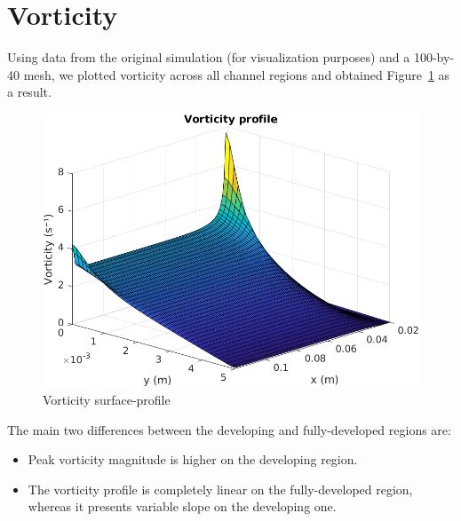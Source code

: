 \documentclass[12pt]{article}
\begin{document}
\section{Vorticity} \label{sec:vorticity}

        Using data from the original simulation (for visualization purposes) and a 100-by-40 mesh, we plotted vorticity across all channel regions and obtained Figure~\ref{fig:vorticity} as a result.

        \begin{figure}[!ht]
                \includegraphics[width=\textwidth]{Vorticity_Profile_Francesco.png}
                \centering
                \caption{Vorticity surface-profile}
                \label{fig:vorticity}
        \end{figure}

        The main two differences between the developing and fully-developed regions are:

        \begin{itemize}
                \item Peak vorticity magnitude is higher on the developing region.
                \item The vorticity profile is completely linear on the fully-developed region, whereas it presents variable slope on the developing one.
        \end{itemize}



\end{document}
